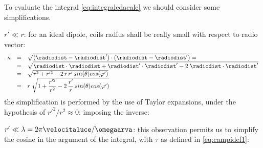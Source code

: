 To evaluate the integral \ref{eq:integraledacalc}  we should consider some simplifications.

$r' \ll r$: for an ideal dipole, coils radius shall be really small with respect to radio vector:
\[
\begin{array}{rcl}
\kappa & = & \sqrt{(\radiodist - \radiodist') \cdot (\radiodist - \radiodist')} = \\
 & = & \sqrt{\radiodist \cdot \radiodist + \radiodist' \cdot \radiodist' - 2\; \radiodist \cdot \radiodist'} \\
 & = & \sqrt{r^2 + r'^2 - 2\,r\,r'\,sin(\theta)cos(\varphi')} \\
 & = & r\;\sqrt{1 + \dfrac{r'^2}{r^2} - 2\,\dfrac{r'}{r}\,sin(\theta)cos(\varphi')}
\end{array}
\]
the simplification is performed by the use of Taylor expansions, under the hypothesis of $r'^2/r^2 \approx 0$:
imposing the inverse:

$r' \ll \lambda = 2\pi\velocitaluce/\omegaarva$: this observation permits us to simplify the cosine in the argument of the integral, with $\tau$ as defined in \ref{eq:campidef1}:

